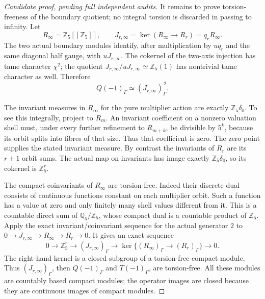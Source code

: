 \begin{proof}[Candidate proof, pending full independent audits]
It remains to prove torsion-freeness of the boundary quotient;
no integral torsion is discarded in passing to infinity.
Let
\[
 R_\infty=\mathbb Z_5[[\mathbb Z_5]],\qquad
 J_{r,\infty}=\ker(R_\infty\longrightarrow R_r)=q_rR_\infty.
\]
The two actual boundary modules identify, after multiplication
by \(u q_r\) and the same diagonal half gauge, with
\(uJ_{r,\infty}\). The cokernel of the two-axis injection
has tame character \(\chi^2\); the quotient
\(J_{r,\infty}/uJ_{r,\infty}\simeq\mathbb Z_5(1)\)
has nontrivial tame character as well. Therefore
\[
                 Q(-1)_\Gamma\simeq
                       (J_{r,\infty})_\Gamma^{\,2}.   \tag{D.88.20}
\]

The invariant measures in \(R_\infty\) for the pure multiplier
action are exactly \(\mathbb Z_5\delta_0\). To see this
integrally, project to \(R_m\). An invariant coefficient on
a nonzero valuation shell must, under every further refinement
to \(R_{m+k}\), be divisible by \(5^k\), because its orbit
splits into fibres of that size. Thus that coefficient is zero.
The zero point supplies the stated invariant measure. By
contrast the invariants of \(R_r\) are its \(r+1\) orbit
sums. The actual map on invariants has image exactly
\(\mathbb Z_5\delta_0\), so its cokernel is \(\mathbb Z_5^r\).

The compact coinvariants of \(R_\infty\) are torsion-free.
Indeed their discrete dual consists of continuous functions
constant on each multiplier orbit. Such a function has a value
at zero and only finitely many shell values different from it.
This is a countable direct sum of \(\mathbb Q_5/\mathbb Z_5\),
whose compact dual is a countable product of \(\mathbb Z_5\).
Apply the exact invariant/coinvariant sequence for the actual
generator \(2\) to \(0\to J_{r,\infty}\to R_\infty\to R_r\to0\).
It gives an exact sequence
\[
 0\longrightarrow\mathbb Z_5^r\longrightarrow
    (J_{r,\infty})_\Gamma\longrightarrow
    \ker\{(R_\infty)_\Gamma\to(R_r)_\Gamma\}
                         \longrightarrow0.            \tag{D.88.21}
\]
The right-hand kernel is a closed subgroup of a torsion-free
compact module. Thus \((J_{r,\infty})_\Gamma\), then
\(Q(-1)_\Gamma\) and \(T(-1)_\Gamma\), are torsion-free.
All these modules are countably based compact modules; the
operator images are closed because they are continuous images
of compact modules.


\end{proof}
